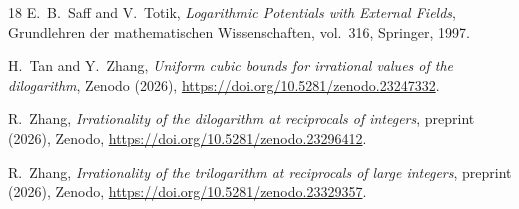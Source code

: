 \documentclass{amsart}
\theoremstyle{remark}
\numberwithin{equation}{section}
\numberwithin{table}{section}
\begin{document}
\begin{thebibliography}{18}
 E.~B.~Saff and V.~Totik, \emph{Logarithmic Potentials with External
 Fields},
Grundlehren der mathematischen Wissenschaften, vol.~316, Springer, 1997.

H.~Tan and Y.~Zhang, \emph{Uniform cubic bounds for irrational values of the
dilogarithm}, Zenodo (2026),
\url{https://doi.org/10.5281/zenodo.23247332}.

R.~Zhang, \emph{Irrationality of the dilogarithm at reciprocals of
integers}, preprint (2026), Zenodo,
\url{https://doi.org/10.5281/zenodo.23296412}.

R.~Zhang, \emph{Irrationality of the trilogarithm at reciprocals of large
integers}, preprint (2026), Zenodo,
\url{https://doi.org/10.5281/zenodo.23329357}.

\end{thebibliography}
\end{document}
